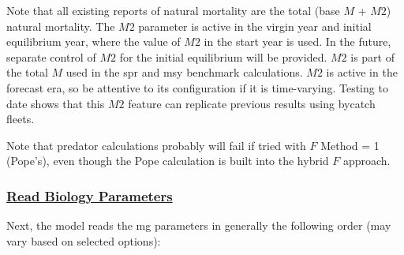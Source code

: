Note that all existing reports of natural mortality are the total (base $M$ + $M2$) natural mortality. The $M2$ parameter is active in the virgin year and initial equilibrium year, where the value of $M2$ in the start year is used. In the future, separate control of $M2$ for the initial equilibrium will be provided. $M2$ is part of the total $M$ used in the \gls{spr} and \gls{msy} benchmark calculations. $M2$ is active in the forecast era, so be attentive to its configuration if it is time-varying. Testing to date shows that this $M2$ feature can replicate previous results using bycatch fleets.

Note that predator calculations probably will fail if tried with $F$ Method = 1 (Pope's), even though the Pope calculation is built into the hybrid $F$ approach.

\hypertarget{ReadBioParams}{}
\subsubsection[Read Biology Parameters]{\protect\hyperlink{ReadBioParams}{Read Biology Parameters}}
\hypertarget{MGorder}{}
Next, the model reads the \gls{mg} parameters in generally the following order (may vary based on selected options):

